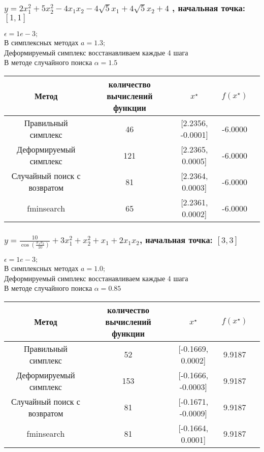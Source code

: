 \documentclass[a4paper,12pt]{article}
\begin{document}
\subsubsection{$y = 2 x_1^2 + 5 x_2^2 - 4 x_1 x_2 - 4\sqrt{5} x_1 + 4 \sqrt{5} x_2 + 4$ , начальная точка: $[1, 1]$}
$\epsilon = 1e-3;$
\\В симплексных методах $a = 1.3;$
\\Деформируемый симплекс восстанавливаем каждые 4 шага
\\В методе случайного поиска $\alpha = 1.5$
\begin{table}[!ht]
  \begin{tabular}{|c|c|c|c|c|}
  \hline
  Метод & количество вычислений функции & $x^{\star}$ & $f(x^{\star})$ \\
  \hline
  Правильный симплекс & 46 & [2.2356, -0.0001] & -6.0000 \\
  \hline
  Деформируемый симплекс & 121 & [2.2365, 0.0005] & -6.0000 \\
  \hline
  Случайный поиск с возвратом & 81 & [2.2364, 0.0003] & -6.0000 \\
  \hline
  fminsearch & 65 & [2.2361, 0.0002] & -6.0000 \\
  \hline
  \end{tabular}
\end{table} 

\newpage

\subsubsection{$y = \frac {10} {\cos({\frac {x_1 x_2} {10}})} + 3 x_1^2 + x_2^2 + x_1 + 2 x_1 x_2$, начальная точка: $[3, 3]$}
$\epsilon = 1e-3;$
\\В симплексных методах $a = 1.0;$
\\Деформируемый симплекс восстанавливаем каждые 4 шага
\\В методе случайного поиска $\alpha = 0.85$
\begin{table}[!ht]
  \begin{tabular}{|c|c|c|c|c|}
  \hline
  Метод & количество вычислений функции & $x^{\star}$ & $f(x^{\star})$ \\
  \hline
  Правильный симплекс & 52 & [-0.1669, 0.0002] & 9.9187 \\
  \hline
  Деформируемый симплекс & 153 & [-0.1666, -0.0003] & 9.9187 \\
  \hline
  Случайный поиск с возвратом & 81 & [-0.1671, -0.0009] & 9.9187 \\
  \hline
  fminsearch & 81 & [-0.1664, 0.0001] & 9.9187 \\
  \hline
  \end{tabular}
\end{table} 
 
\end{document}

